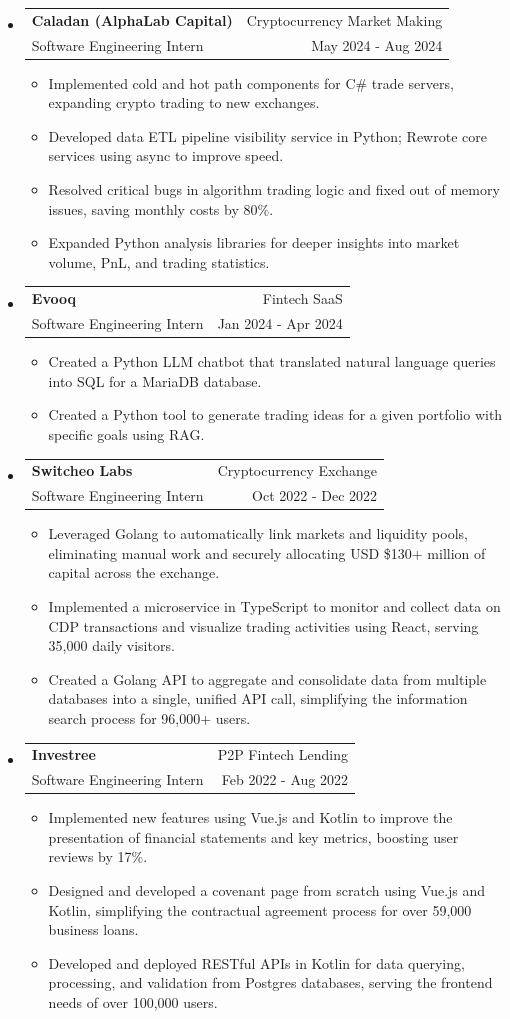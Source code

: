 \documentclass[letterpaper, 11pt]{article}
\makeatletter
\newcommand{\ResumeEntryTSDL}[4]{
  \vspace{1pt}\item
    \begin{tabular*}{\textwidth}[t]{l@{\extracolsep{\fill}}r} 
      \textbf{#1} & #2 \\
      #3 & #4 \\
    \end{tabular*}\vspace{-2.835pt} %
}
\newcommand{\ResumeItemDefault}[1]{
  \item{
    #1 \vspace{-2.835pt}
  }
}
\newcommand{\ResumeEntryStart}{\begin{itemize}[leftmargin=0mm, label={}]}
\newcommand{\ResumeEntryEnd}{\end{itemize}\vspace{-2.835pt}} %
\newcommand{\ResumeItemListStart}{\begin{itemize}[leftmargin=5mm, label=$\bullet$, itemsep=1mm, parsep=1mm]} %
\newcommand{\ResumeItemListEnd}{\end{itemize}}
\makeatother
\begin{document}
  \ResumeEntryStart
  \ResumeEntryTSDL{Caladan (AlphaLab Capital)}{Cryptocurrency Market Making}{Software Engineering Intern}{May 2024 - Aug 2024}
  \ResumeItemListStart
  \ResumeItemDefault{Implemented cold and hot path components for C\# trade servers, expanding crypto trading to new exchanges.}
  \ResumeItemDefault{Developed data ETL pipeline visibility service in Python; Rewrote core services using async to improve speed.}
  \ResumeItemDefault{Resolved critical bugs in algorithm trading logic and fixed out of memory issues, saving monthly costs by 80\%.}
  \ResumeItemDefault{Expanded Python analysis libraries for deeper insights into market volume, PnL, and trading statistics.}
  \ResumeItemListEnd
  \ResumeEntryEnd

  \ResumeEntryStart
    \ResumeEntryTSDL{Evooq}{Fintech SaaS}{Software Engineering Intern}{Jan 2024 - Apr 2024}
    \ResumeItemListStart
    \ResumeItemDefault{Created a Python LLM chatbot that translated natural language queries into SQL for a MariaDB database.}
    \ResumeItemDefault{Created a Python tool to generate trading ideas for a given portfolio with specific goals using RAG.}
    \ResumeItemListEnd
  \ResumeEntryEnd


  \ResumeEntryStart
    \ResumeEntryTSDL{Switcheo Labs}{Cryptocurrency Exchange}{Software Engineering Intern}{Oct 2022 - Dec 2022}
    \ResumeItemListStart
    \ResumeItemDefault{Leveraged Golang to automatically link markets and liquidity pools, eliminating manual work and securely allocating USD \$130+ million of capital across the exchange.}
    \ResumeItemDefault{Implemented a microservice in TypeScript to monitor and collect data on CDP transactions and visualize trading activities using React, serving 35,000 daily visitors.}
    \ResumeItemDefault{Created a Golang API to aggregate and consolidate data from multiple databases into a single, unified API call, simplifying the information search process for 96,000+ users.}
    \ResumeItemListEnd
  \ResumeEntryEnd

  \ResumeEntryStart
    \ResumeEntryTSDL{Investree}{P2P Fintech Lending}{Software Engineering Intern}{Feb 2022 - Aug 2022}
    \ResumeItemListStart
      \ResumeItemDefault{Implemented new features using Vue.js and Kotlin to improve the presentation of financial statements and key metrics, boosting user reviews by 17\%.}
      \ResumeItemDefault{Designed and developed a covenant page from scratch using Vue.js and Kotlin, simplifying the contractual agreement process for over 59,000 business loans.}
      \ResumeItemDefault{Developed and deployed RESTful APIs in Kotlin for data querying, processing, and validation from Postgres databases, serving the frontend needs of over 100,000 users.}
    \ResumeItemListEnd
  \ResumeEntryEnd
\end{document}
